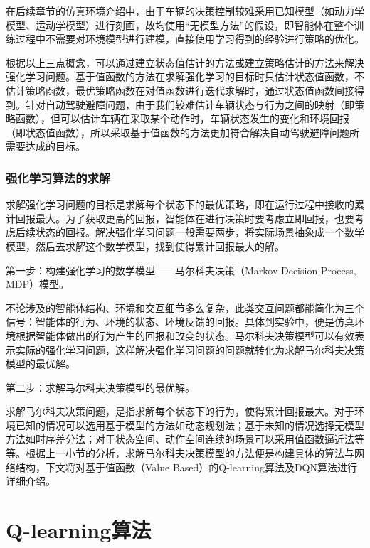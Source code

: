 在后续章节的仿真环境介绍中，由于车辆的决策控制较难采用已知模型（如动力学模型、运动学模型）进行刻画，故均使用“无模型方法”的假设，即智能体在整个训练过程中不需要对环境模型进行建模，直接使用学习得到的经验进行策略的优化。

根据以上三点概念，可以通过建立状态值估计的方法或建立策略估计的方法来解决强化学习问题。基于值函数的方法在求解强化学习的目标时只估计状态值函数，不估计策略函数，最优策略函数在对值函数进行迭代求解时，通过状态值函数间接得到。针对自动驾驶避障问题，由于我们较难估计车辆状态与行为之间的映射（即策略函数），但可以估计车辆在采取某个动作时，车辆状态发生的变化和环境回报（即状态值函数），所以采取基于值函数的方法更加符合解决自动驾驶避障问题所需要达成的目标。

\subsubsection{强化学习算法的求解} %

求解强化学习问题的目标是求解每个状态下的最优策略，即在运行过程中接收的累计回报最大。为了获取更高的回报，智能体在进行决策时要考虑立即回报，也要考虑后续状态的回报。解决强化学习问题一般需要两步，将实际场景抽象成一个数学模型，然后去求解这个数学模型，找到使得累计回报最大的解。

第一步：构建强化学习的数学模型——马尔科夫决策（Markov Decision Process, MDP）\cite{monahan1982state}模型。

不论涉及的智能体结构、环境和交互细节多么复杂，此类交互问题都能简化为三个信号：智能体的行为、环境的状态、环境反馈的回报。具体到实验中，便是仿真环境根据智能体做出的行为产生的回报和改变的状态。马尔科夫决策模型可以有效表示实际的强化学习问题，这样解决强化学习问题的问题就转化为求解马尔科夫决策模型的最优解。

第二步：求解马尔科夫决策模型的最优解。

求解马尔科夫决策问题，是指求解每个状态下的行为，使得累计回报最大。对于环境已知的情况可以选用基于模型的方法如动态规划法；基于未知的情况选择无模型方法如时序差分法；对于状态空间、动作空间连续的场景可以采用值函数逼近法等等。根据上一小节的分析，求解马尔科夫决策模型的方法便是构建具体的算法与网络结构，下文将对基于值函数（Value Based）的Q-learning算法及DQN算法进行详细介绍。

\section{Q-learning算法} %

